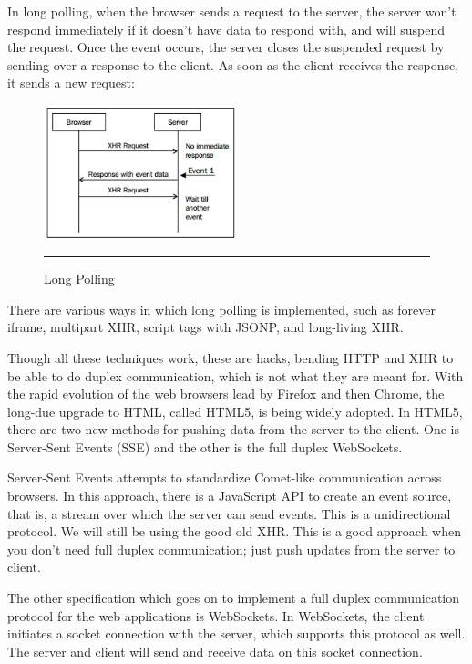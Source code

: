 In long polling, when the browser sends a request to the server, the server won't
respond immediately if it doesn't have data to respond with, and will suspend the
request. Once the event occurs, the server closes the suspended request by sending
over a response to the client. As soon as the client receives the response, it sends a
new request:
\begin{figure}[h!]
  \centering
    \includegraphics[width=0.5\textwidth]{./Pictures/long_poling.jpg}
  \rule{0.5\textwidth}{1pt}
  \caption{Long Polling}
\end{figure}
There are various ways in which long polling is implemented, such as forever iframe,
multipart XHR, script tags with JSONP, and long-living XHR.

Though all these techniques work, these are hacks, bending HTTP and XHR to be
able to do duplex communication, which is not what they are meant for.
With the rapid evolution of the web browsers lead by Firefox and then Chrome, the
long-due upgrade to HTML, called HTML5, is being widely adopted. In HTML5,
there are two new methods for pushing data from the server to the client. One is
Server-Sent Events (SSE) and the other is the full duplex WebSockets.

Server-Sent Events attempts to standardize Comet-like communication across
browsers. In this approach, there is a JavaScript API to create an event source, that is,
a stream over which the server can send events. This is a unidirectional protocol. We
will still be using the good old XHR. This is a good approach when you don't need
full duplex communication; just push updates from the server to client.

The other specification which goes on to implement a full duplex communication
protocol for the web applications is WebSockets. In WebSockets, the client initiates
a socket connection with the server, which supports this protocol as well. The server
and client will send and receive data on this socket connection.
